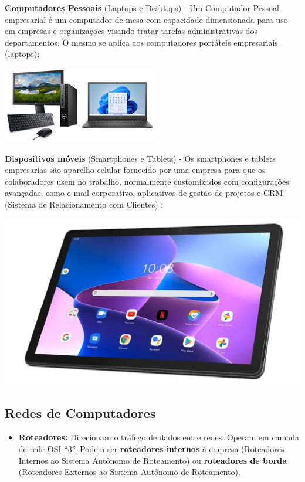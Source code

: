 \documentclass[
]{book}
\providecommand{\tightlist}{%
  \setlength{\itemsep}{0pt}\setlength{\parskip}{0pt}}
\begin{document}
\textbf{Computadores Pessoais} (Laptops e Desktops) - Um Computador Pessoal empresarial é um computador de mesa com capacidade dimensionada para uso em empresas e organizações visando tratar tarefas administrativas dos departamentos. O mesmo se aplica aos computadores portáteis empresariais (laptops);

\includegraphics{images/InfraEstrutura/hardware/02-desktop-laptop.jpg}

\textbf{Dispositivos móveis} (Smartphones e Tablets) - Os smartphones e tablets empresarias são aparelho celular fornecido por uma empresa para que os colaboradores usem no trabalho, normalmente customizados com configurações avançadas, como e-mail corporativo, aplicativos de gestão de projetos e CRM (Sistema de Relacionamento com Clientes) ;

\includegraphics{images/InfraEstrutura/hardware/04-tablet_lenovo.jpg}

\subsection{Redes de Computadores}\label{redes-de-computadores}

\begin{itemize}
\tightlist
\item
  \textbf{Roteadores:} Direcionam o tráfego de dados entre redes. Operam em camada de rede OSI ``3''. Podem ser \textbf{roteadores internos} à empresa (Roteadores Internos ao Sistema Autônomo de Roteamento) ou \textbf{roteadores de borda} (Roteadores Externos ao Sistema Autônomo de Roteamento).
\end{itemize}
\end{document}
